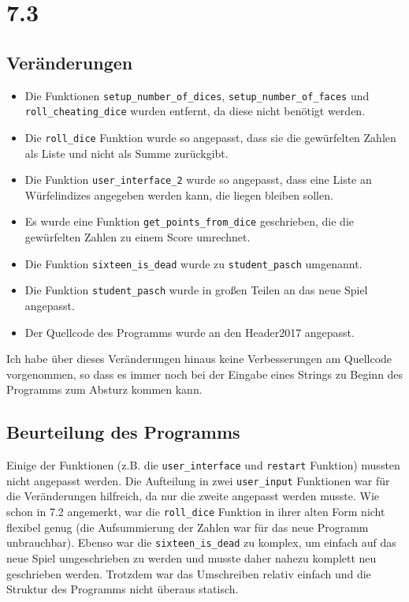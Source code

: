 \newpage

\section*{7.3}
\subsection*{Veränderungen}
\begin{itemize}
\item Die Funktionen \verb+setup_number_of_dices+, \verb+setup_number_of_faces+ und \verb+roll_cheating_dice+ wurden entfernt, da diese nicht benötigt werden.
\item Die \verb+roll_dice+ Funktion wurde so angepasst, dass sie die gewürfelten Zahlen als Liste und nicht als Summe zurückgibt.
\item Die Funktion \verb+user_interface_2+ wurde so angepasst, dass eine Liste an Würfelindizes angegeben werden kann, die liegen bleiben sollen.
\item Es wurde eine Funktion \verb+get_points_from_dice+ geschrieben, die die gewürfelten Zahlen zu einem Score umrechnet.
\item Die Funktion \verb+sixteen_is_dead+ wurde zu \verb+student_pasch+ umgenannt.
\item Die Funktion \verb+student_pasch+ wurde in großen Teilen an das neue Spiel angepasst.
\item Der Quellcode des Programms wurde an den Header2017 angepasst.
\end{itemize}

Ich habe über dieses Veränderungen hinaus keine Verbesserungen am Quellcode vorgenommen, so dass es immer noch bei der Eingabe eines Strings zu Beginn des Programms zum Absturz kommen kann.

\subsection*{Beurteilung des Programms}
Einige der Funktionen  (z.B. die \verb+user_interface+ und \verb+restart+ Funktion) mussten nicht angepasst werden. Die Aufteilung in zwei \verb+user_input+ Funktionen war für die Veränderungen hilfreich, da nur die zweite angepasst werden musste. Wie schon in 7.2  angemerkt, war die \verb+roll_dice+ Funktion in ihrer alten Form nicht flexibel genug (die Aufsummierung der Zahlen war für das neue Programm unbrauchbar). Ebenso war die \verb+sixteen_is_dead+ zu komplex, um einfach auf das neue Spiel umgeschrieben zu werden und musste daher nahezu komplett neu geschrieben werden. Trotzdem war das Umschreiben relativ einfach und die Struktur des Programms nicht überaus statisch.

